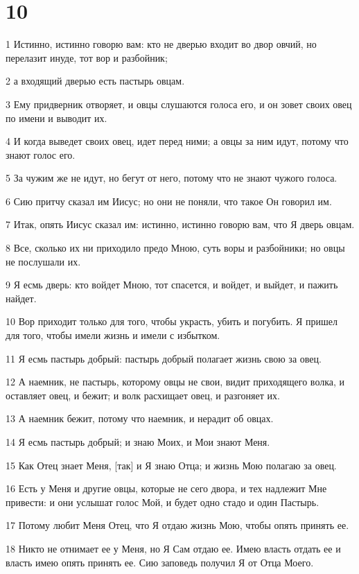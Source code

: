 \chapter{10}

\par 1 Истинно, истинно говорю вам: кто не дверью входит во двор овчий, но перелазит инуде, тот вор и разбойник;
\par 2 а входящий дверью есть пастырь овцам.
\par 3 Ему придверник отворяет, и овцы слушаются голоса его, и он зовет своих овец по имени и выводит их.
\par 4 И когда выведет своих овец, идет перед ними; а овцы за ним идут, потому что знают голос его.
\par 5 За чужим же не идут, но бегут от него, потому что не знают чужого голоса.
\par 6 Сию притчу сказал им Иисус; но они не поняли, что такое Он говорил им.
\par 7 Итак, опять Иисус сказал им: истинно, истинно говорю вам, что Я дверь овцам.
\par 8 Все, сколько их ни приходило предо Мною, суть воры и разбойники; но овцы не послушали их.
\par 9 Я есмь дверь: кто войдет Мною, тот спасется, и войдет, и выйдет, и пажить найдет.
\par 10 Вор приходит только для того, чтобы украсть, убить и погубить. Я пришел для того, чтобы имели жизнь и имели с избытком.
\par 11 Я есмь пастырь добрый: пастырь добрый полагает жизнь свою за овец.
\par 12 А наемник, не пастырь, которому овцы не свои, видит приходящего волка, и оставляет овец, и бежит; и волк расхищает овец, и разгоняет их.
\par 13 А наемник бежит, потому что наемник, и нерадит об овцах.
\par 14 Я есмь пастырь добрый; и знаю Моих, и Мои знают Меня.
\par 15 Как Отец знает Меня, [так] и Я знаю Отца; и жизнь Мою полагаю за овец.
\par 16 Есть у Меня и другие овцы, которые не сего двора, и тех надлежит Мне привести: и они услышат голос Мой, и будет одно стадо и один Пастырь.
\par 17 Потому любит Меня Отец, что Я отдаю жизнь Мою, чтобы опять принять ее.
\par 18 Никто не отнимает ее у Меня, но Я Сам отдаю ее. Имею власть отдать ее и власть имею опять принять ее. Сию заповедь получил Я от Отца Моего.
